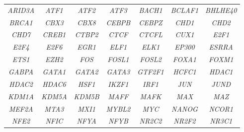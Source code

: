 \begin{table}[!htb]
  \begin{scriptsize}
    \begin{tabulary}{0.95\linewidth}{ccccccc}
      \textit{ARID3A} & \textit{ATF1} & \textit{ATF2} & \textit{ATF3} & \textit{BACH1} & \textit{BCLAF1} & \textit{BHLHE40} \\
      \textit{BRCA1} & \textit{CBX3} & \textit{CBX8} & \textit{CEBPB} & \textit{CEBPZ} & \textit{CHD1} & \textit{CHD2}   \\
      \textit{CHD7}  &  \textit{CREB1} & \textit{CTBP2} & \textit{CTCF} &  \textit{CTCFL} &  \textit{CUX1} &   \textit{E2F1}   \\
      \textit{E2F4}  &  \textit{E2F6} &   \textit{EGR1}  &  \textit{ELF1} & \textit{ELK1} &  \textit{EP300} & \textit{ESRRA}  \\
      \textit{ETS1} &   \textit{EZH2}  &  \textit{FOS}  &  \textit{FOSL1} &  \textit{FOSL2} &  \textit{FOXA1} &  \textit{FOXM1}  \\
      \textit{GABPA} &  \textit{GATA1} &  \textit{GATA2} &  \textit{GATA3} &  \textit{GTF2F1} &  \textit{HCFC1} &  \textit{HDAC1}  \\
      \textit{HDAC2}  &  \textit{HDAC6} &  \textit{HSF1} &   \textit{IKZF1} &  \textit{IRF1}  &  \textit{JUN}  &   \textit{JUND}   \\
      \textit{KDM1A} & \textit{KDM5A} &  \textit{KDM5B} &  \textit{MAFF} & \textit{MAFK} & \textit{MAX} & \textit{MAZ} \\
      \textit{MEF2A} &  \textit{MTA3} &  \textit{MXI1} &   \textit{MYBL2} &  \textit{MYC} &  \textit{NANOG} & \textit{NCOR1}  \\
      \textit{NFE2} &  \textit{NFIC} &  \textit{NFYA} &  \textit{NFYB} &  \textit{NR2C2} & \textit{NR2F2} &  \textit{NR3C1}  \\
    \end{tabulary}
  \end{scriptsize}
  \label{tab:encode-tfs-first-part}
\end{table}

